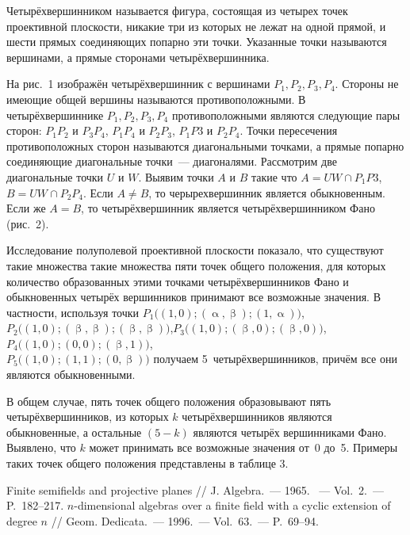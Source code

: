 Четырёхвершинником называется  фигура, состоящая из четырех точек проективной плоскости, никакие три из которых не лежат на одной прямой, и шести прямых соединяющих попарно эти точки. Указанные точки называются вершинами, а прямые сторонами четырёхвершинника.

На рис.~1 изображён четырёхвершинник с вершинами $P_1, P_2, P_3, P_4$. Стороны не имеющие общей вершины называются противоположными. В четырёхвершиннике $P_1, P_2, P_3, P_4$ противоположными являются следующие пары сторон: $P_1P_2$ и $P_3P_4$, $P_1P_4$ и $P_2P_3$, $P_1P3$ и $P_2P_4$. Точки пересечения противоположных сторон называются диагональными точками, а прямые попарно соединяющие диагональные точки~--- диагоналями. Рассмотрим две диагональные точки $U$ и $W$. Выявим точки $A$ и $B$ такие что $A = UW \cap P_1P3$, $B = UW \cap P_2P_4$. Если $A \neq B$, то черырехвершинник является обыкновенным. Если же $A = B$, то четырёхвершинник является четырёхвершинником Фано (рис.~2).

\vspace{-8pt}





Исследование полуполевой проективной плоскости  показало, что существуют такие множества такие множества пяти точек общего положения, для которых количество образованных этими точками четырёхвершинников Фано и обыкновенных четырёх вершинников принимают все возможные значения. В частности, используя точки $P_1 \bigl((1,0);(\upalpha,\upbeta);(1,\upalpha)\bigr)$, $P_2 \bigl((1,0);(\upbeta,\upbeta);(\upbeta,\upbeta)\bigr)$,\quad\quad $P_3 \bigl((1,0);(\upbeta,0);(\upbeta,0)\bigr)$,\quad\quad $P_4 \bigl((1,0);(0,0);(\upbeta,1)\bigr)$,\\ $P_5 \bigl((1,0);(1,1);(0,\upbeta)\bigr)$  получаем 5~четырёхвершинников, причём все они являются обыкновенными.

В общем случае, пять точек общего положения образовывают пять  четырёхвершинников, из которых $k$ четырёхвершинников являются обыкновенные, а остальные $(5-k)$ являются четырёх вершинниками Фано. Выявлено, что $k$ может принимать все возможные значения от~0 до~5. Примеры таких точек общего положения представлены в таблице 3.





\begin{thebibliography}{99}

\bibitem{} Finite semifields and projective planes // J. Algebra.~--- 1965. ~--- Vol.~2.~--- P.~182--217.
\bibitem{} $n$-dimensional algebras over a finite field with a cyclic extension of degree $n$ // Geom. Dedicata.~--- 1996.~--- Vol.~63.~--- P.~69--94.


\end{thebibliography}
